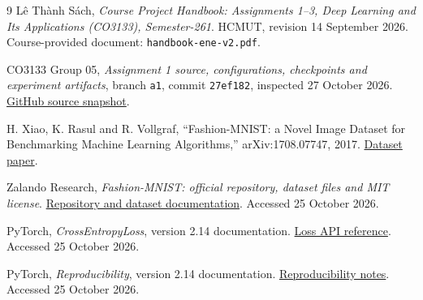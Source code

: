 \clearpage
{}
{}
\begin{thebibliography}{9}
Lê Thành Sách, \emph{Course Project Handbook: Assignments 1--3, Deep Learning and Its Applications (CO3133), Semester-261}. HCMUT, revision 14 September 2026. Course-provided document: \texttt{handbook-ene-v2.pdf}.

CO3133 Group 05, \emph{Assignment 1 source, configurations, checkpoints and experiment artifacts}, branch \texttt{a1}, commit \texttt{27ef182}, inspected 27 October 2026.
\href{https://github.com/Sunnyngooo/CO3133_Group05_Assignment/tree/27ef182308f0f6ac6f04510ee9fc77b9a16cc14a/assignment1}{GitHub source snapshot}.

H. Xiao, K. Rasul and R. Vollgraf, ``Fashion-MNIST: a Novel Image Dataset for Benchmarking Machine Learning Algorithms,'' arXiv:1708.07747, 2017.
\href{https://arxiv.org/abs/1708.07747}{Dataset paper}.

Zalando Research, \emph{Fashion-MNIST: official repository, dataset files and MIT license}.
\href{https://github.com/zalandoresearch/fashion-mnist}{Repository and dataset documentation}.
Accessed 25 October 2026.

PyTorch, \emph{CrossEntropyLoss}, version 2.14 documentation.
\href{https://docs.pytorch.org/docs/2.14/generated/torch.nn.CrossEntropyLoss.html}{Loss API reference}.
Accessed 25 October 2026.

PyTorch, \emph{Reproducibility}, version 2.14 documentation.
\href{https://docs.pytorch.org/docs/2.14/notes/randomness.html}{Reproducibility notes}.
Accessed 25 October 2026.
\end{thebibliography}
